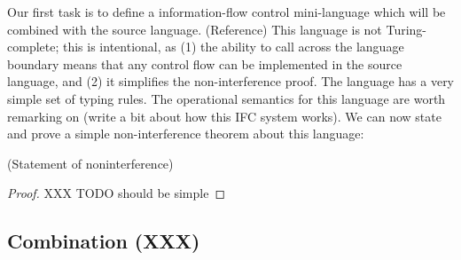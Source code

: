 Our first task is to define a information-flow control mini-language
which will be combined with the source language. (Reference)  This
language is not Turing-complete; this is intentional, as (1) the ability
to call across the language boundary means that any control flow can be
implemented in the source language, and (2) it simplifies the
non-interference proof.  The language has a very simple set of typing
rules.  The operational semantics for this language are worth remarking
on (write a bit about how this IFC system works).  We can now state and
prove a simple non-interference theorem about this language:

\begin{theorem}
(Statement of noninterference)
\end{theorem}
\begin{proof}
XXX TODO should be simple
\end{proof}

\subsection{Combination (XXX)}


